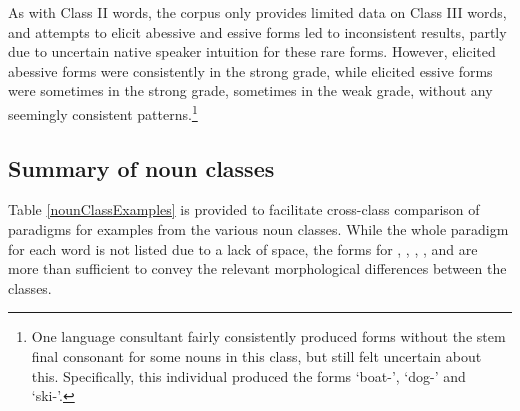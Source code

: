 As with Class II words, the corpus only provides limited data on Class III words, and attempts to elicit abessive and essive forms led to inconsistent results, partly due to uncertain native speaker intuition for these rare forms. However, elicited abessive forms were consistently in the strong grade, while elicited essive forms were sometimes in the strong grade, sometimes in the weak grade, without any seemingly consistent patterns.\footnote{One language consultant fairly consistently produced  forms without the stem final consonant for some nouns in this class, but still felt uncertain about this. Specifically, this individual produced the forms  ‘boat-’,  ‘dog-’ and  ‘ski-’.} 

\FB

\subsection{Summary of noun classes}\label{summaryNounClasses}
Table \vref{nounClassExamples} is provided to facilitate cross-class comparison of paradigms for examples from the various noun classes. While the whole paradigm for each word is not listed due to a lack of space, the forms for , , , ,  and  are more than sufficient to convey the relevant morphological differences between the classes.


